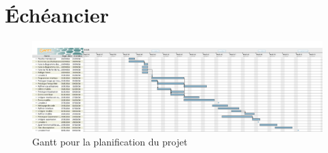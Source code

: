 %

\chapter{Échéancier}
\label{s:echeancier}

\begin{figure}[htpb]
    \centering
    \includegraphics[scale=0.3, angle=90]{fig/echeancier.png}
    \caption{Gantt pour la planification du projet}
    \label{fig:echeancier}
\end{figure}
